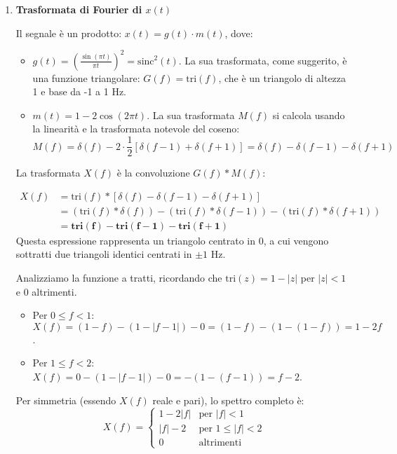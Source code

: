 \begin{soluzione}{24}
    \begin{enumerate}
        \item \textbf{Trasformata di Fourier di $x(t)$}
        
        Il segnale è un prodotto: $x(t) = g(t) \cdot m(t)$, dove:
        \begin{itemize}
            \item $g(t) = \left( \frac{\sin(\pi t)}{\pi t} \right)^2 = \text{sinc}^2(t)$. La sua trasformata, come suggerito, è una funzione triangolare: $G(f) = \text{tri}(f)$, che è un triangolo di altezza 1 e base da -1 a 1 Hz.
            \item $m(t) = 1 - 2\cos(2\pi t)$. La sua trasformata $M(f)$ si calcola usando la linearità e la trasformata notevole del coseno:
            \[
                M(f) = \delta(f) - 2 \cdot \frac{1}{2}[\delta(f-1) + \delta(f+1)] = \delta(f) - \delta(f-1) - \delta(f+1)
            \]
        \end{itemize}
        La trasformata $X(f)$ è la convoluzione $G(f) * M(f)$:
 
        \begin{align*}
            X(f) &= \text{tri}(f) * [\delta(f) - \delta(f-1) - \delta(f+1)] \\
            &= (\text{tri}(f) * \delta(f)) - (\text{tri}(f) * \delta(f-1)) - (\text{tri}(f) * \delta(f+1)) \\
            &= \mathbf{\text{tri}(f) - \text{tri}(f-1) - \text{tri}(f+1)}
        \end{align*}
        Questa espressione rappresenta un triangolo centrato in 0, a cui vengono sottratti due triangoli identici centrati in $\pm 1$ Hz.
        
        Analizziamo la funzione a tratti, ricordando che $\text{tri}(z) = 1-|z|$ per $|z|<1$ e 0 altrimenti.
        \begin{itemize}
            \item Per $0 \le f < 1$: $X(f) = (1-f) - (1-|f-1|) - 0 = (1-f) - (1-(1-f)) = 1-2f$.
            \item Per $1 \le f < 2$: $X(f) = 0 - (1-|f-1|) - 0 = -(1-(f-1)) = f-2$.
        \end{itemize}
        Per simmetria (essendo $X(f)$ reale e pari), lo spettro completo è:
        \[
           X(f) = \begin{cases} 1 - 2|f| & \text{per } |f| < 1 \\ |f|-2 & \text{per } 1 \le |f| < 2 \\ 0 & \text{altrimenti} \end{cases}
        \]
        

\end{enumerate}
\end{soluzione}
